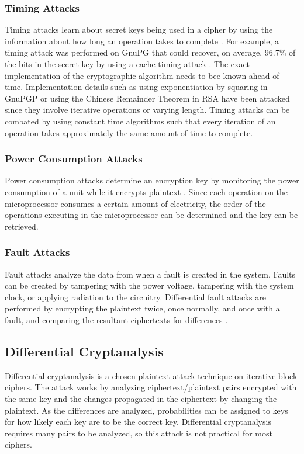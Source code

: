 \documentclass[12pt]{article}
\begin{document}
\subsubsection{Timing Attacks}
Timing attacks learn about secret keys being used in a cipher by using the information about how long an operation takes to complete \cite[pg 3]{sidechannel}. For example, a timing attack was performed on GnuPG that could recover, on average, 96.7\% of the bits in the secret key by using a cache timing attack \cite[pg. 719]{flushreload}. The exact implementation of the cryptographic algorithm needs to bee known ahead of time. Implementation details such as using exponentiation by squaring in GnuPGP or using the Chinese Remainder Theorem in RSA have been attacked since they involve iterative operations or varying length. Timing attacks can be combated by using constant time algorithms such that every iteration of an operation takes approximately the same amount of time to complete.

\subsubsection{Power Consumption Attacks}
Power consumption attacks determine an encryption key by monitoring the power consumption of a unit while it encrypts plaintext \cite[pg. 6]{sidechannel}. Since each operation on the microprocessor consumes a certain amount of electricity, the order of the operations executing in the microprocessor can be determined and the key can be retrieved.

\subsubsection{Fault Attacks}
Fault attacks analyze the data from when a fault is created in the system. Faults can be created by tampering with the power voltage, tampering with the system clock, or applying radiation to the circuitry. Differential fault attacks are performed by encrypting the plaintext twice, once normally, and once with a fault, and comparing the resultant ciphertexts for differences \cite[pg. 7]{sidechannel}.

\subsection{Differential Cryptanalysis}
Differential cryptanalysis is a chosen plaintext attack technique on iterative block ciphers. The attack works by analyzing ciphertext/plaintext pairs encrypted with the same key and the changes propagated in the ciphertext by changing the plaintext. As the differences are analyzed, probabilities can be assigned to keys for how likely each key are to be the correct key. Differential cryptanalysis requires many pairs to be analyzed, so this attack is not practical for most ciphers\cite[pg. 285-290]{appcrypt}.
\end{document}
